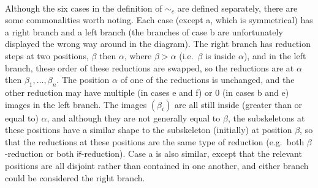 \documentclass{article}
\newcommand\set[1]{\{#1\}}
\newcommand\Leb{\mathrm{Leb}}
\theoremstyle{definition}
\theoremstyle{lemma}
\theoremstyle{remark}
\begin{document}
\paragraph{}
Although the six cases in the definition of $\sim_c$ are defined separately, there are some commonalities worth noting. Each case (except a, which is symmetrical) has a right branch and a left branch (the branches of case b are unfortunately displayed the wrong way around in the diagram). The right branch has reduction steps at two positions, $\beta$ then $\alpha$, where $\beta > \alpha$ (i.e.~$\beta$ is inside $\alpha$), and in the left branch, these order of these reductions are swapped, so the reductions are at $\alpha$ then $\beta_1, \dots, \beta_n$. The position $\alpha$ of one of the reductions is unchanged, and the other reduction may have multiple (in cases e and f) or 0 (in cases b and e) images in the left branch. The images $(\beta_i)$ are all still inside (greater than or equal to) $\alpha$, and although they are not generally equal to $\beta$, the subskeletons at these positions have a similar shape to the subskeleton (initially) at position $\beta$, so that the reductions at these positions are the same type of reduction (e.g.~both $\beta$-reduction or both $\textsf{if}$-reduction). Case a is also similar, except that the relevant positions are all disjoint rather than contained in one another, and either branch could be considered the right branch.

\iffalse
\changed[lo]{Since $L_s(M)$ is a countable set, there is a unique probability measure $\mu$ on the infinite product $\prod_{i \in L_s(M)} \Sigma_I$ of the Borel $\sigma$-algebras $\Sigma_I$ satisfying
\[
\mu\set{\omega \in \Omega \mid \omega_1 \in A_1, \cdots, \omega_n \in A_n} = \prod_{i=1}^n \Leb(A_i)
\]
where $\Leb$ is the Lebesgue measure on the measurable space $(I, \Sigma_I)$.}
\fi
\end{document}
